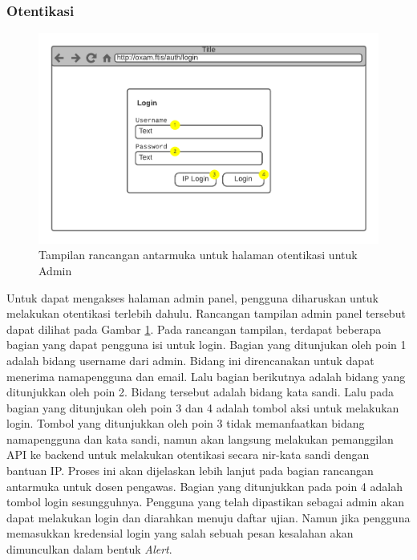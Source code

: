 \subsubsection{Otentikasi}
    \begin{figure}
        \centering
        \includegraphics[width=0.7\paperwidth]{Gambar/mockups/Mockup--Admin - Login.pdf}
        \caption{Tampilan rancangan antarmuka untuk halaman otentikasi untuk Admin}
        \label{fig:mockup_admin_login}
    \end{figure}
    Untuk dapat mengakses halaman admin panel, pengguna diharuskan untuk
    melakukan otentikasi terlebih dahulu. Rancangan tampilan admin panel
    tersebut dapat dilihat pada Gambar \ref{fig:mockup_admin_login}. Pada
    rancangan tampilan, terdapat beberapa bagian yang dapat pengguna isi untuk
    login. Bagian yang ditunjukan oleh poin 1 adalah bidang username dari admin.
    Bidang ini direncanakan untuk dapat menerima namapengguna dan email. Lalu
    bagian berikutnya adalah bidang yang ditunjukkan oleh poin 2. Bidang
    tersebut adalah bidang kata sandi. Lalu pada bagian yang ditunjukan oleh
    poin 3 dan 4 adalah tombol aksi untuk melakukan login. Tombol yang
    ditunjukkan oleh poin 3 tidak memanfaatkan bidang namapengguna dan kata
    sandi, namun akan langsung melakukan pemanggilan API ke backend untuk
    melakukan otentikasi secara nir-kata sandi dengan bantuan IP. Proses ini
    akan dijelaskan lebih lanjut pada bagian rancangan antarmuka untuk dosen
    pengawas. Bagian yang ditunjukkan pada poin 4 adalah tombol login
    sesungguhnya. Pengguna yang telah dipastikan sebagai admin akan dapat
    melakukan login dan diarahkan menuju daftar ujian. Namun jika pengguna
    memasukkan kredensial login yang salah sebuah pesan kesalahan akan
    dimunculkan dalam bentuk \textit{Alert}.
    
